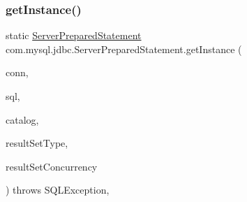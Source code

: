 \subsubsection{\texorpdfstring{get\+Instance()}{getInstance()}}
{\footnotesize\ttfamily static \mbox{\hyperlink{classcom_1_1mysql_1_1jdbc_1_1_server_prepared_statement}{Server\+Prepared\+Statement}} com.\+mysql.\+jdbc.\+Server\+Prepared\+Statement.\+get\+Instance (\begin{DoxyParamCaption}\item[{\mbox{\hyperlink{interfacecom_1_1mysql_1_1jdbc_1_1_my_s_q_l_connection}{My\+S\+Q\+L\+Connection}}}]{conn,  }\item[{String}]{sql,  }\item[{String}]{catalog,  }\item[{int}]{result\+Set\+Type,  }\item[{int}]{result\+Set\+Concurrency }\end{DoxyParamCaption}) throws S\+Q\+L\+Exception\hspace{0.3cm}{\ttfamily [static]}, {\ttfamily [protected]}}

